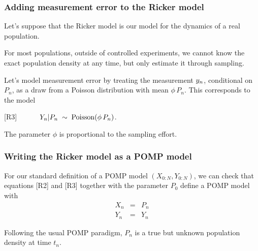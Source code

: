 \documentclass{beamer}\usepackage[]{graphicx}\usepackage[]{color}
\newcommand\myeq{\hspace{10mm}}
\begin{document}
\begin{frame}[fragile] 
\frametitle{Adding measurement error to the Ricker model}

\bi
\item Let's suppose that the Ricker model is our model for the dynamics of a real population.

\item For most populations, outside of controlled experiments, we cannot know the exact population density at any time, but only estimate it through sampling.

\item Let's model measurement error by treating the measurement $y_{n}$, conditional on $P_n$, as a draw from a Poisson distribution with mean $\phi\,P_n$. This corresponds to the model

\ei

\vspace{2mm}

[R3] $\myeq Y_{n}|P_n\;\sim\;\mathrm{Poisson}(\phi\,P_{n})$.

\vspace{1mm}

\bi

\item The parameter $\phi$ is proportional to the sampling effort.

\ei

\end{frame}

\begin{frame}[fragile]

\frametitle{Writing the Ricker model as a POMP model}

\bi
\item For our standard definition of a POMP model $(X_{0:N},Y_{0:N})$, we can check that equations [R2] and [R3] together with the parameter $P_0$ define a POMP model with
\begin{eqnarray}
X_n &=& P_n \\
Y_n &=& Y_n 
\end{eqnarray}

\item Following the usual POMP paradigm, $P_n$ is a true but unknown population density at time $t_n$.

\ei

\end{frame}    
\end{document}

